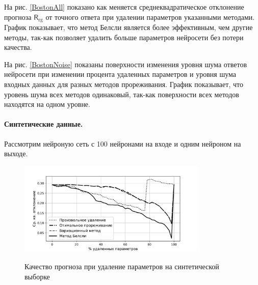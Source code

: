 На рис. \ref{BostonAll} показано как меняется среднеквадратическое отклонение прогноза $\mathsf{R}_{\text{rg}}$ от точного ответа  при удалении параметров указанными методами. График показывает, что метод Белсли является более эффективным, чем другие методы, так-как позволяет удалить больше параметров нейросети без потери качества.

На рис. \ref{BostonNoise} показаны поверхности изменения уровня шума ответов нейросети при изменении процента удаленных параметров и уровня шума входных данных для разных методов прореживания. График показывает, что уровень шума всех методов одинаковый, так-как поверхности всех методов находятся на одном уровне.


\paragraph{Синтетические данные.} Рассмотрим нейроную сеть с 100 нейронами на входе и одним нейроном на выходе.

\begin{figure}[h!t]\center
\includegraphics[width=0.8\textwidth]{results/relevant/Data1/All.pdf}\\
\caption{Качество прогноза при удаление параметров на синтетической выборке}
\label{Data1All}
\end{figure}

